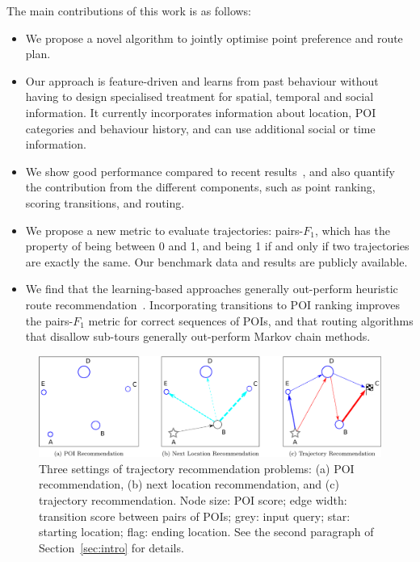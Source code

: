 The main contributions of this work is as follows:
\begin{itemize}
\setlength{\itemsep}{-2pt}
\item We propose a novel algorithm to jointly optimise point preference and route plan.
\item Our approach is feature-driven and learns from past behaviour without having to design specialised treatment for spatial, temporal and social information. It currently incorporates information about location, POI categories and behaviour history, and can use additional social or time information.%
\item We show good performance compared to recent results~\cite{ijcai15}, and also quantify the contribution from the different components, such as point ranking, scoring transitions, and routing.
\item We propose a new metric to evaluate trajectories: pairs-$F_1$, which has the property of being between 0 and 1, and being 1 if and only if two trajectories are exactly the same. Our benchmark data and results are publicly available.
\item We find that the learning-based approaches generally out-perform heuristic route recommendation~\cite{ijcai15}. Incorporating transitions to POI ranking improves the pairs-$F_1$ metric for correct sequences of POIs, and that routing algorithms that disallow sub-tours generally out-perform Markov chain methods.
\end{itemize}

\begin{figure}[ht]
	\centering
	\includegraphics[width=\textwidth]{fig/fig1-flavours.pdf}
	\caption{Three settings of trajectory recommendation problems: (a) POI recommendation, (b) next location recommendation, and (c) trajectory recommendation. Node size: POI score; edge width: transition score between pairs of POIs; grey: input query; star: starting location; flag: ending location. See the second paragraph of Section~\ref{sec:intro} for details.
}
	\label{fig:threesettings}
\end{figure}
